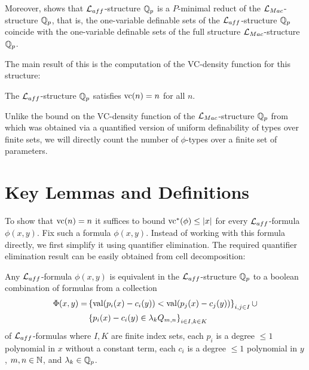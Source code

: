 Moreover, \cite{reduct} shows that $\mathcal L_{aff}$-structure $\mathbb{Q}_p$ is a $P$-minimal reduct
of the $\mathcal L_{Mac}$-structure $\mathbb{Q}_p$,
that is, the one-variable definable sets of the $\mathcal L_{aff}$-structure $\mathbb{Q}_p$
coincide with the one-variable definable sets of the full structure $\mathcal L_{Mac}$-structure $\mathbb{Q}_p$.

The main result of this \chapa is the computation of the VC-density function for this structure:
\begin{Theorem} \label{main_theorem}
  The $\mathcal L_{aff}$-structure $\mathbb{Q}_p$ satisfies $\operatorname{vc}(n) = n$ for all $n$.
\end{Theorem}
 
Unlike the bound on the VC-density function of the $\mathcal L_{Mac}$-structure $\mathbb{Q}_p$ from \cite{density}
which was obtained via a quantified version of uniform definability of types over finite sets,
we will directly count the number of $\phi$-types over a finite set of parameters.


\section{Key Lemmas and Definitions}
To show that $\operatorname{vc}(n) = n$ it suffices to bound $\operatorname{vc}^*(\phi) \leq |x|$ for every $\mathcal L_{aff}$-formula $\phi(x, y)$.
Fix such a formula $\phi(x, y)$.
Instead of working with this formula directly, we first simplify it using quantifier elimination.
The required quantifier elimination result can be easily obtained from cell decomposition:
\begin{Lemma} \label {quantifier_elimination}
  Any $\mathcal L_{aff}$-formula $\phi(x, y)$ is equivalent in the $\mathcal L_{aff}$-structure $\mathbb{Q}_p$ to a boolean combination of formulas from a collection
  \begin{align*}
    \Phi(x, y) = &\left\{\operatorname{val} (p_i(x) - c_i(y)) < \operatorname{val} (p_j(x) - c_j(y))\right\}_{i, j \in I} \cup \\
                 &\left\{p_i(x) - c_i(y) \in \lambda_k Q_{m,n}\right\}_{i \in I , k \in K}
  \end{align*}
  of $\mathcal L_{aff}$-formulas
  where $I, K$ are finite index sets,
  each $p_i$ is a degree $\leq 1$ polynomial in $x$ without a constant term,
  each $c_i$ is a degree $\leq 1$ polynomial in $y$,
  $m,n \in \mathbb{N}$,
  and
  $\lambda_k \in \mathbb{Q}_p$.
\end{Lemma}

